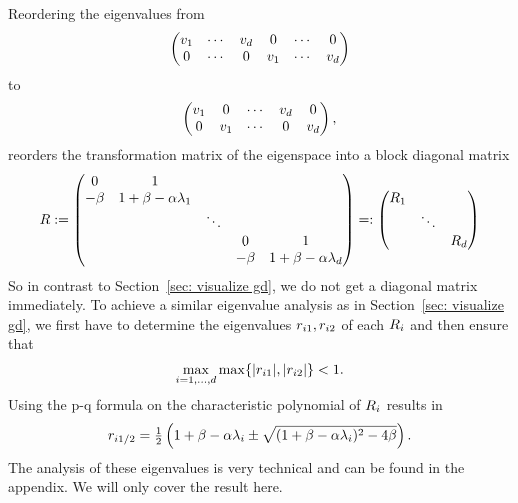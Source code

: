 %
Reordering the eigenvalues from
\begin{align*}
	\begin{pmatrix}
		v_1 & \cdots & v_d & 0 & \cdots & 0\\
		0 & \cdots & 0 & v_1 & \cdots & v_d
	\end{pmatrix}
\end{align*}
%
to
%
\begin{align*}
	\begin{pmatrix}
		v_1 & 0 & \cdots & v_d & 0 \\
		0 & v_1 & \cdots & 0 & v_d
	\end{pmatrix},
\end{align*}
%
reorders the transformation matrix of the eigenspace into a block diagonal matrix
%
\begin{align}\label{eq: eigenspace momentum transformation}
	R := \begin{pmatrix}
		0 & 1 \\
		-\beta & 1+\beta - \alpha\lambda_1 & \\
		& & \ddots & \\
		& & & 0 & 1 \\
		& & & -\beta & 1+\beta - \alpha\lambda_d \\
	\end{pmatrix}
	=: \begin{pmatrix}
		R_1 \\
		& \ddots\\
		&& R_d
	\end{pmatrix}
\end{align}
%
So in contrast to Section~\ref{sec: visualize gd}, we do not get a diagonal
matrix immediately. To achieve a similar eigenvalue analysis as in
Section~\ref{sec: visualize gd}, we first have to determine the eigenvalues
\(r_{i1},r_{i2}\) of each \(R_i\) and then ensure that
\begin{align}
	\max_{i=1,\dots, d} \max\{|r_{i1}|,|r_{i2}|\} < 1.
\end{align}
Using the p-q formula on the characteristic polynomial of \(R_i\)
results in 
\begin{align*}
	r_{i1/2}
	= \tfrac12 \left(
		1+\beta-\alpha\lambda_i
		\pm \sqrt{(1+\beta-\alpha\lambda_i)^2 - 4\beta}
	\right).
\end{align*}
%
The analysis of these eigenvalues is very technical and can be found in the
appendix. We will only cover the result here.

